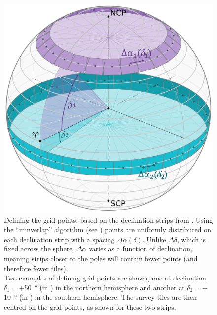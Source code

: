 \begin{colsection}
\begin{colsection}
\begin{figure}[t]
    \begin{center}
        \includegraphics[width=\linewidth]{images/globe3.pdf}
    \end{center}
    \caption[Defining grid points]{
        Defining the grid points, based on the declination strips from . Using the ``minverlap'' algorithm (see ) points are uniformly distributed on each declination strip with a spacing $\Delta\alpha(\delta)$. Unlike $\Delta\delta$, which is fixed across the sphere, $\Delta\alpha$ varies as a function of declination, meaning strips closer to the poles will contain fewer points (and therefore fewer tiles). \\
        Two examples of defining grid points are shown, one at declination $\delta_1=+$\SI{50}{\degree} (in ) in the northern hemisphere and another at $\delta_2=-$\SI{10}{\degree} (in ) in the southern hemisphere. The survey tiles are then centred on the grid points, as shown for these two strips.
    }\label{fig:deltaalpha}
\end{figure}

\clearpage


\end{colsection}
\end{colsection}
